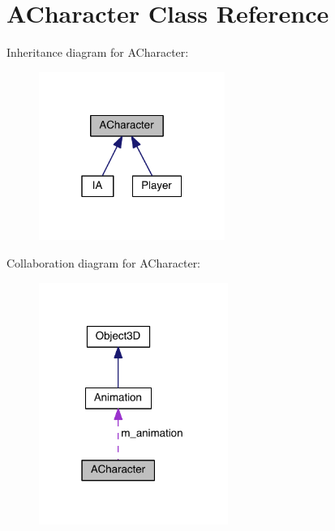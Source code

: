 \hypertarget{class_a_character}{}\section{A\+Character Class Reference}
\label{class_a_character}


Inheritance diagram for A\+Character\+:
\nopagebreak
\begin{figure}[H]
\begin{center}
\leavevmode
\includegraphics[width=172pt]{class_a_character__inherit__graph}
\end{center}
\end{figure}


Collaboration diagram for A\+Character\+:\nopagebreak
\begin{figure}[H]
\begin{center}
\leavevmode
\includegraphics[width=175pt]{class_a_character__coll__graph}
\end{center}
\end{figure}
